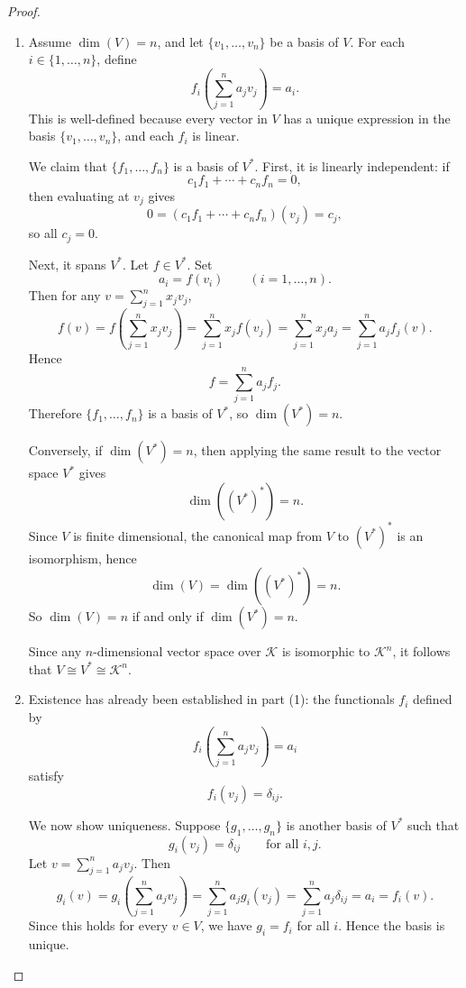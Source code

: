 \documentclass{ctexart}
\begin{document}
    \begin{proof}
    \leavevmode
    \begin{enumerate}
        \item Assume $\dim(V)=n$, and let $\{v_1,\dots,v_n\}$ be a basis of $V$. For each $i\in\{1,\dots,n\}$, define
        \[
        f_i\!\left(\sum_{j=1}^n a_jv_j\right)=a_i.
        \]
        This is well-defined because every vector in $V$ has a unique expression in the basis $\{v_1,\dots,v_n\}$, and each $f_i$ is linear.

        We claim that $\{f_1,\dots,f_n\}$ is a basis of $V^*$. First, it is linearly independent: if
        \[
        c_1f_1+\cdots+c_nf_n=0,
        \]
        then evaluating at $v_j$ gives
        \[
        0=(c_1f_1+\cdots+c_nf_n)(v_j)=c_j,
        \]
        so all $c_j=0$.

        Next, it spans $V^*$. Let $f\in V^*$. Set
        \[
        a_i=f(v_i)\qquad (i=1,\dots,n).
        \]
        Then for any $v=\displaystyle\sum_{j=1}^n x_jv_j$,
        \[
        f(v)
        =
        f\!\left(\sum_{j=1}^n x_jv_j\right)
        =
        \sum_{j=1}^n x_jf(v_j)
        =
        \sum_{j=1}^n x_ja_j
        =
        \sum_{j=1}^n a_jf_j(v).
        \]
        Hence
        \[
        f=\sum_{j=1}^n a_jf_j.
        \]
        Therefore $\{f_1,\dots,f_n\}$ is a basis of $V^*$, so $\dim(V^*)=n$.

        Conversely, if $\dim(V^*)=n$, then applying the same result to the vector space $V^*$ gives
        \[
        \dim((V^*)^*)=n.
        \]
        Since $V$ is finite dimensional, the canonical map from $V$ to $(V^*)^*$ is an isomorphism, hence
        \[
        \dim(V)=\dim((V^*)^*)=n.
        \]
        So $\dim(V)=n$ if and only if $\dim(V^*)=n$.

        Since any $n$-dimensional vector space over $\mathcal{K}$ is isomorphic to $\mathcal{K}^n$, it follows that $V\cong V^*\cong \mathcal{K}^n$.

        \item Existence has already been established in part (1): the functionals $f_i$ defined by
        \[
        f_i\!\left(\sum_{j=1}^n a_jv_j\right)=a_i
        \]
        satisfy
        \[
        f_i(v_j)=\delta_{ij}.
        \]

        We now show uniqueness. Suppose $\{g_1,\dots,g_n\}$ is another basis of $V^*$ such that
        \[
        g_i(v_j)=\delta_{ij}
        \qquad
        \text{for all } i,j.
        \]
        Let $v=\displaystyle \sum_{j=1}^n a_jv_j$. Then
        \[
        g_i(v)
        =
        g_i\!\left(\sum_{j=1}^n a_jv_j\right)
        =
        \sum_{j=1}^n a_jg_i(v_j)
        =
        \sum_{j=1}^n a_j\delta_{ij}
        =
        a_i
        =
        f_i(v).
        \]
        Since this holds for every $v\in V$, we have $g_i=f_i$ for all $i$. Hence the basis is unique.


\end{enumerate}
\end{proof}
\end{document}
